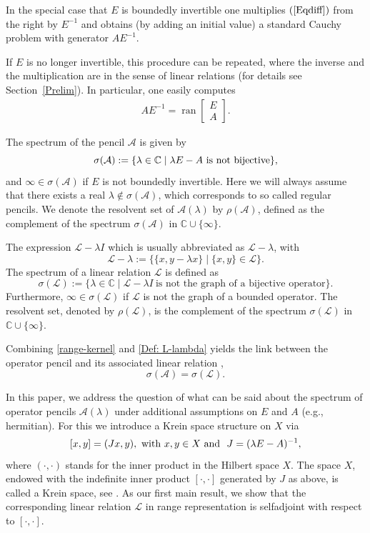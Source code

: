 \documentclass{birkjour}
\theoremstyle{definition}
\theoremstyle{remark}
\numberwithin{equation}{section}
\newcommand{\C}{\mathbb C}
\newcommand{\A}{\mathcal A}
\newcommand{\Ll}{\mathcal L}
\DeclareMathOperator{\ran}{ran}
\begin{document}
In the special case that $E$ is boundedly invertible one multiplies $(\ref{Eqdiff})$ from the right by $E^{-1}$ and obtains (by adding an initial value) a standard Cauchy problem with generator  $AE^{-1}$. 

If $E$ is no longer invertible, this procedure can be repeated, where the inverse and the
 multiplication are in the sense of linear relations
 (for details see Section~\ref{Prelim}). In particular, one easily computes \begin{align}
     A E^{-1} =\ran\begin{bmatrix}
			E\\ A \end{bmatrix}.
 \end{align} 

\noindent The spectrum of the pencil $\A$ is given by
\begin{equation*}
   \sigma(\A):= \{ \lambda \in \C \mid \lambda E-A \hbox{ is not bijective} \},
\end{equation*} 
and $\infty\in\sigma(\A) $ if $E$ is not boundedly invertible.
Here we will always assume that there exists a real $\lambda \notin \sigma(\A)$, which corresponds to so called regular pencils. We denote the resolvent set of $\A(\lambda)$ by $\rho(\A)$, defined as the complement of the spectrum $\sigma(\A)$ in $\C\cup \{\infty\}$.


The expression $\Ll-\lambda I$ which is usually abbreviated as $\Ll-\lambda$, with \begin{equation}\label{Def: L-lambda}
	\Ll - \lambda := \{\{x,y-\lambda x\}\mid \{x,y\}\in \Ll\}.
\end{equation}
The spectrum of a linear relation $\Ll$ is defined as 
$$
\sigma(\Ll):=\{\lambda \in \C  \mid \Ll -\lambda I \ \text{is not the graph of a bijective operator}\}.
$$
Furthermore, $\infty\in \sigma(\Ll) $ if $\Ll$ is not the graph of a bounded operator. The resolvent set, denoted by $\rho(\Ll)$, is the complement of the spectrum $\sigma(\Ll)$ in $\C\cup \{\infty\}$.

Combining \eqref{range-kernel} and \eqref{Def: L-lambda} yields the link between the operator pencil and its associated linear relation \cite{GT21},
\begin{equation}\label{Arnstadt}
    \sigma (\A)=\sigma (\Ll).
\end{equation}

In this paper, we address the question of what can be said about the spectrum of operator pencils $\A(\lambda)$ under additional assumptions on $E$ and $A$ (e.g., hermitian).
For this we introduce a Krein space structure on $X$ via 
 $$ 
 [x, y]=(Jx,y), \ \hbox{with} \ x, y \in X \ \hbox{and} \ \ J= (\lambda E-A)^{-1},  
 $$ 
 where $(\cdot, \cdot)$ stands for the inner product in the Hilbert space $X$.  The space $X$, endowed with
the indefinite inner product $[\cdot,\cdot]$ generated by $J$ as above, is called a Krein space, see \cite{B74, IKL}. 
As our first main result, we show that the corresponding linear relation $\Ll$ in range representation is selfadjoint with respect to $[\cdot, \cdot]$. 
\end{document}
